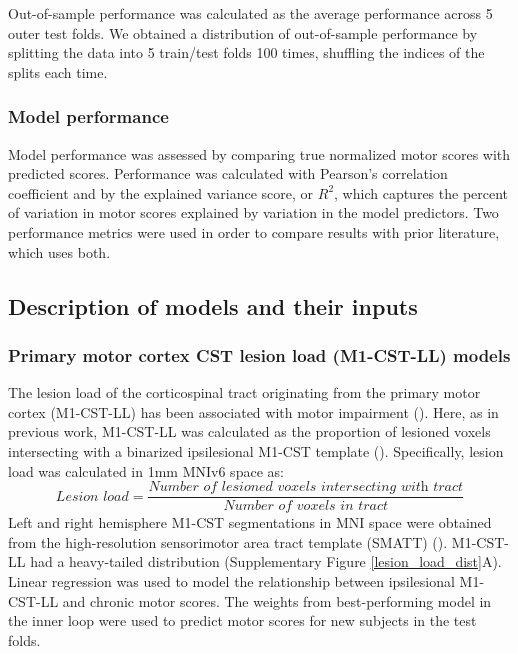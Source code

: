 \documentclass[phd,tocprelim]{cornell}
\begin{document}
Out-of-sample performance was calculated as the average performance across 5 outer test folds. We obtained a distribution of out-of-sample performance by splitting the data into 5 train/test folds 100 times, shuffling the indices of the splits each time. 

\subsubsection{Model performance}
Model performance was assessed by comparing true normalized motor scores with predicted scores. Performance was calculated with Pearson's correlation coefficient and by the explained variance score, or $R^2$, which captures the percent of variation in motor scores explained by variation in the model predictors. Two performance metrics were used in order to compare results with prior literature, which uses both.

\subsection{Description of models and their inputs}
\subsubsection{Primary motor cortex CST lesion load (M1-CST-LL) models}

The lesion load of the corticospinal tract originating from the primary motor cortex (M1-CST-LL) has been associated with motor impairment (\cite{Stinear2017-eg}). Here, as in previous work, M1-CST-LL was calculated as the proportion of lesioned voxels intersecting with a binarized ipsilesional M1-CST template (\cite{Zhu2010-qh}). Specifically, lesion load was calculated in 1mm MNIv6 space as:
\begin{equation}
    \textit{Lesion load} = \frac{\textit{Number of lesioned voxels intersecting with  tract}}{\textit{Number of voxels in tract}}
\end{equation}
Left and right hemisphere M1-CST segmentations in MNI space were obtained from the high-resolution sensorimotor area tract template (SMATT) (\cite{Archer2018-ti}). M1-CST-LL had a heavy-tailed distribution (Supplementary Figure \ref{lesion_load_dist}A).
Linear regression was used to model the relationship between ipsilesional M1-CST-LL and chronic motor scores. The weights from best-performing model in the inner loop were used to predict motor scores for new subjects in the test folds. 
\end{document}
